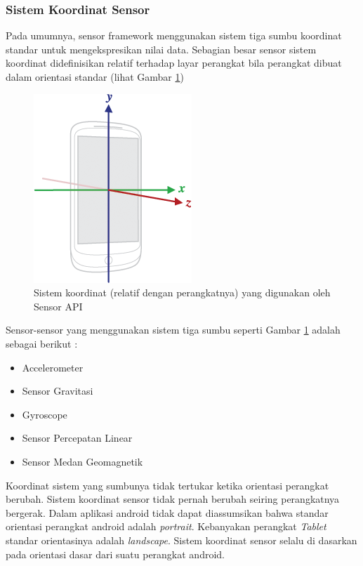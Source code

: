 \subsubsection{Sistem Koordinat Sensor}
\label{sec:sistem_koordinat_sensor}
Pada umumnya, sensor framework menggunakan sistem tiga sumbu koordinat standar untuk mengekspresikan nilai data. Sebagian besar sensor sistem koordinat didefinisikan relatif terhadap layar perangkat bila perangkat dibuat dalam orientasi standar (lihat Gambar \ref{fig:axis-device})
\begin{figure}[htbp]
	\centering
		\includegraphics[scale=1]{Gambar/axis-device.png}
	\caption{Sistem koordinat (relatif dengan perangkatnya) yang digunakan oleh Sensor API}
	\label{fig:axis-device}
\end{figure}
Sensor-sensor yang menggunakan sistem tiga sumbu seperti Gambar \ref{fig:axis-device} adalah sebagai berikut :
\begin{itemize}
	\item Accelerometer
	\item Sensor Gravitasi
	\item Gyroscope
	\item Sensor Percepatan Linear
	\item Sensor Medan Geomagnetik
\end{itemize}
Koordinat sistem yang sumbunya tidak tertukar ketika orientasi perangkat berubah. Sistem koordinat sensor tidak pernah berubah seiring perangkatnya bergerak. Dalam aplikasi android tidak dapat diassumsikan bahwa standar orientasi perangkat android adalah \textit{portrait}. Kebanyakan perangkat \textit{Tablet} standar orientasinya adalah \textit{landscape}. Sistem koordinat sensor selalu di dasarkan pada orientasi dasar dari suatu perangkat android.
